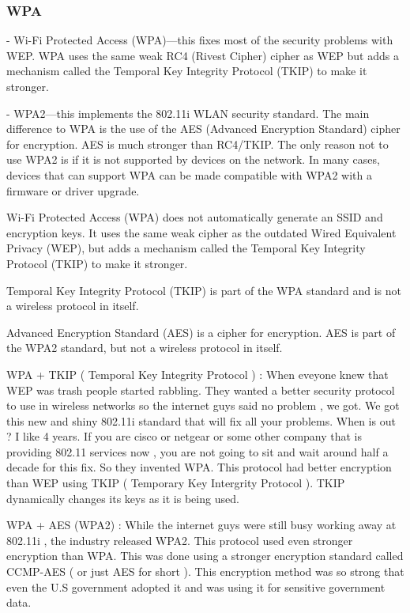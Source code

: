 \subsubsectionend

\subsubsection{WPA}
\label{sssec:wpa}

- Wi-Fi Protected Access (WPA)—this fixes most of the security problems with WEP. WPA uses the same weak RC4 (Rivest Cipher) cipher as WEP but adds a mechanism called the Temporal Key Integrity Protocol (TKIP) to make it stronger.  

- WPA2—this implements the 802.11i WLAN security standard. The main difference to WPA is the use of the AES (Advanced Encryption Standard) cipher for encryption. AES is much stronger than RC4/TKIP. The only reason not to use WPA2 is if it is not supported by devices on the network. In many cases, devices that can support WPA can be made compatible with WPA2 with a firmware or driver upgrade. 

Wi-Fi Protected Access (WPA) does not automatically generate an SSID and encryption keys. It uses the same weak cipher as the outdated Wired Equivalent Privacy (WEP), but adds a mechanism called the Temporal Key Integrity Protocol (TKIP) to make it stronger. 

 

Temporal Key Integrity Protocol (TKIP) is part of the WPA standard and is not a wireless protocol in itself.

 

Advanced Encryption Standard (AES) is a cipher for encryption. AES is part of the WPA2 standard, but not a wireless protocol in itself.

WPA + TKIP ( Temporal Key Integrity Protocol ) : When eveyone knew that WEP was
trash people started rabbling. They wanted a better security protocol to use in
wireless networks so the internet guys said no problem , we got. We got this new
and shiny 802.11i standard that will fix all your problems. When is out ? I like
4 years. If you are cisco or netgear or some other company that is providing
802.11 services now , you are not going to sit and wait around half a decade for
this fix. So they invented WPA. This protocol had better encryption than WEP
using TKIP ( Temporary Key Intergrity Protocol ). TKIP dynamically changes its
keys as it is being used.

WPA + AES (WPA2) : While the internet guys were still busy working away at
802.11i , the industry released WPA2. This protocol used even stronger
encryption than WPA. This was done using a stronger encryption standard called
CCMP-AES ( or just AES for short ). This encryption method was so strong that
even the U.S government adopted it and was using it for sensitive government
data.

